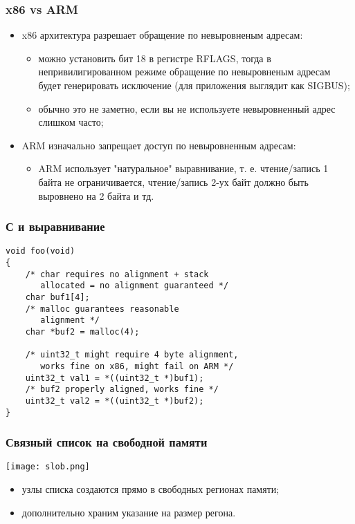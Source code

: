 \begin{frame}
\frametitle{x86 vs ARM}
\begin{itemize}
  \item x86 архитектура разрешает обращение по невыровненым адресам:
  \begin{itemize}
    \item можно установить бит 18 в регистре RFLAGS, тогда в непривилигированном
    режиме обращение по невыровненым адресам будет генерировать исключение (для
    приложения выглядит как SIGBUS);
    \item обычно это не заметно, если вы не используете невыровненный адрес
    слишком часто;
  \end{itemize}
  \item ARM изначально запрещает доступ по невыровненным адресам:
  \begin{itemize}
    \item ARM использует "натуральное" выравнивание, т. е. чтение/запись 1 байта
    не ограничивается, чтение/запись 2-ух байт должно быть выровнено на 2 байта
    и тд.
  \end{itemize}
\end{itemize}
\end{frame}

\begin{frame}[fragile]
\frametitle{С и выравнивание}
\begin{lstlisting}
void foo(void)
{
    /* char requires no alignment + stack
       allocated = no alignment guaranteed */
    char buf1[4];
    /* malloc guarantees reasonable
       alignment */
    char *buf2 = malloc(4);

    /* uint32_t might require 4 byte alignment,
       works fine on x86, might fail on ARM */
    uint32_t val1 = *((uint32_t *)buf1);
    /* buf2 properly aligned, works fine */
    uint32_t val2 = *((uint32_t *)buf2);
}
\end{lstlisting}
\end{frame}

\begin{frame}
\frametitle{Связный список на свободной памяти}
\begin{center}
  \texttt{[image: slob.png]}
\end{center}
\begin{itemize}
  \item узлы списка создаются прямо в свободных регионах памяти;
  \item дополнительно храним указание на размер регона.
\end{itemize}
\end{frame}

